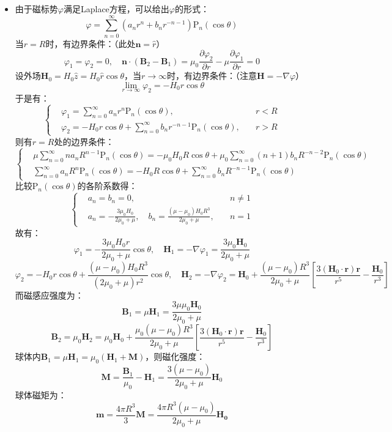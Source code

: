 \documentclass[a4paper,fontset=none]{ctexart}
\begin{document}
\begin{itemize}
    \item[5.]
    由于磁标势$\varphi$满足Laplace方程，可以给出$\varphi$的形式：
    \[
    \varphi = \sum_{n=0}^\infty (a_n r^n + b_n r^{-n-1})\mathrm{P}_n(\cos\theta)
    \]
    当$r=R$时，有边界条件：（此处$\bm{n}=\hat{r}$）
    \[
    \varphi_1 = \varphi_2 = 0,\quad \bm{n}\cdot(\bm{B}_2 - \bm{B}_1) = \mu_0\frac{\partial\varphi_2}{\partial r} - \mu\frac{\partial\varphi_1}{\partial r} = 0
    \]
    设外场$\bm{H}_0=H_0\hat{z}=H_0\hat{r}\cos\theta$，当$r\to\infty$时，有边界条件：（注意$\bm{H}=-\nabla\varphi$）
    \[
    \lim_{r\to\infty}\varphi_2 = -H_0 r\cos\theta
    \]
    于是有：
    \[
    \left\{
        \begin{aligned}
        &\varphi_1 = \sum_{n=0}^\infty a_n r^n\mathrm{P}_n(\cos\theta),\quad &r<R \\
        &\varphi_2 = -H_0 r\cos\theta + \sum_{n=0}^\infty b_n r^{-n-1}\mathrm{P}_n(\cos\theta),\quad &r>R
        \end{aligned}
    \right.
    \]
    则有$r=R$处的边界条件：
    \[
    \left\{
        \begin{aligned}
        &\mu\sum\limits_{n=0}^\infty n a_n R^{n-1}\mathrm{P}_n(\cos\theta) = -\mu_0H_0R\cos\theta + \mu_0\sum\limits_{n=0}^\infty (n+1)b_n R^{-n-2}\mathrm{P}_n(\cos\theta) \\
        &\sum_{n=0}^\infty a_n R^n\mathrm{P}_n(\cos\theta) = -H_0R\cos\theta + \sum_{n=0}^\infty b_n R^{-n-1}\mathrm{P}_n(\cos\theta)
        \end{aligned}
    \right.
    \]
    比较$\mathrm{P}_n(\cos\theta)$的各阶系数得：
    \[
    \left\{
        \begin{aligned}
        &a_n = b_n = 0,\quad &n\neq1 \\
        &a_n = -\frac{3\mu_0 H_0}{2\mu_0+\mu},\quad b_n = \frac{(\mu-\mu_0) H_0 R^3}{2\mu_0+\mu},\quad &n=1
        \end{aligned}
    \right.
    \]
    故有：
    \[
    \varphi_1 = -\frac{3\mu_0 H_0r}{2\mu_0+\mu}\cos\theta,\quad
    \bm{H}_1 = -\nabla\varphi_1 = \frac{3\mu_0\bm{H}_0}{2\mu_0+\mu}
    \]
    \[
    \varphi_2 = -H_0r\cos\theta + \frac{(\mu-\mu_0) H_0 R^3}{(2\mu_0+\mu)r^2}\cos\theta,\quad
    \bm{H}_2 = -\nabla\varphi_2 = \bm{H}_0 + \frac{(\mu-\mu_0)R^3}{2\mu_0+\mu}\left[\frac{3(\bm{H}_0\cdot\bm{r})\bm{r}}{r^5}-\frac{\bm{H}_0}{r^3}\right]
    \]
    而磁感应强度为：
    \[
    \bm{B}_1 = \mu\bm{H}_1 = \frac{3\mu\mu_0\bm{H}_0}{2\mu_0+\mu}
    \]
    \[
    \bm{B}_2 = \mu_0\bm{H}_2 = \mu_0\bm{H}_0 + \frac{\mu_0(\mu-\mu_0)R^3}{2\mu_0+\mu}\left[\frac{3(\bm{H}_0\cdot\bm{r})\bm{r}}{r^5}-\frac{\bm{H}_0}{r^3}\right]
    \]
    球体内$\bm{B}_1=\mu\bm{H}_1=\mu_0(\bm{H}_1+\bm{M})$，则磁化强度：
    \[
    \bm{M} = \frac{\bm{B}_1}{\mu_0} - \bm{H}_1 = \frac{3(\mu-\mu_0)}{2\mu_0+\mu}\bm{H}_0
    \]
    球体磁矩为：
    \[
    \bm{m} = \frac{4\pi R^3}{3}\bm{M} = \frac{4\pi R^3(\mu-\mu_0)}{2\mu_0+\mu}\bm{H_0}
    \]

    \end{itemize}
\end{document}
